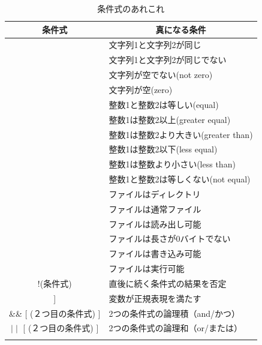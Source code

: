 \documentclass[a4j]{ltjsreport}
\begin{document}
    \begin{center}
        \begin{longtable}{|c|l|}
            \hline
            \multicolumn{1}{|c|}{\textbf{条件式}}&\multicolumn{1}{|c|}{\textbf{真になる条件}}\\
            \hline\hline
            [ 文字列1 = 文字列2 ] & 文字列1と文字列2が同じ \\
            \hline
            [ 文字列1 != 文字列2 ] & 文字列1と文字列2が同じでない\\
            \hline
            [ -n 文字列 ]  & 文字列が空でない(not zero) \\
            \hline
            [ -z 文字列 ]  & 文字列が空(zero) \\
            \hline
            [ 整数1 -eq 整数2 ] & 整数1と整数2は等しい(equal) \\
            \hline
            [ 整数1 -ge 整数2 ] & 整数1は整数2以上(greater equal)   \\
            \hline
            [ 整数1 -gt 整数2 ] & 整数1は整数2より大きい(greater than)  \\
            \hline
            [ 整数1 -le 整数2 ] & 整数1は整数2以下(less equal)  \\
            \hline
            [ 整数1 -lt 整数2 ] & 整数1は整数より小さい(less than)  \\
            \hline
            [ 整数1 -ne 整数2 ] & 整数1と整数2は等しくない(not equal) \\
            \hline
            [ -d ファイル名 ] & ファイルはディレクトリ \\
            \hline
            [ -f ファイル名 ] & ファイルは通常ファイル \\
            \hline
            [ -r ファイル名 ] & ファイルは読み出し可能 \\
            \hline
            [ -s ファイル名 ] & ファイルは長さが0バイトでない \\
            \hline
            [ -w ファイル名 ] & ファイルは書き込み可能 \\
            \hline
            [ -x ファイル名 ] & ファイルは実行可能 \\
            \hline
            !(条件式) & 直後に続く条件式の結果を否定 \\
            \hline
            [[ (変数) =$\sim$ (正規表現) ]] & 変数が正規表現を満たす\\
            \hline
            [ (１つ目の条件式) ] \&\& [ (２つ目の条件式) ]& 2つの条件式の論理積（and/かつ）\\
            \hline
            [ (１つ目の条件式) ] $\mid\mid$ [ (２つ目の条件式) ] & 2つの条件式の論理和（or/または）\\
            \hline
            \caption{条件式のあれこれ}
        \end{longtable}
    \end{center}
\end{document}
